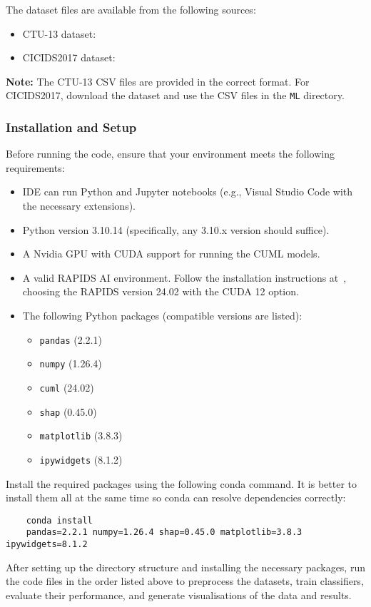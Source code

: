 The dataset files are available from the following sources:

\begin{itemize}
    \item CTU-13 dataset:~\cite{CTU13download}
    \item CICIDS2017 dataset:~\cite{CICIDS2017download}
\end{itemize}

\textbf{Note:} The CTU-13 CSV files are provided in the correct format. For CICIDS2017, download the dataset and use the CSV files in the \texttt{ML} directory.

\subsubsection{Installation and Setup}

Before running the code, ensure that your environment meets the following requirements:

\begin{itemize}
    \item IDE can run Python and Jupyter notebooks (e.g., Visual Studio Code with the necessary extensions).
    \item Python version 3.10.14 (specifically, any 3.10.x version should suffice).
    \item A Nvidia GPU with CUDA support for running the CUML models.
    \item A valid RAPIDS AI environment. 
    Follow the installation instructions at~\cite{RAPIDSdownload}, choosing the RAPIDS version 24.02 with the CUDA 12 option.
    \item The following Python packages (compatible versions are listed):
    \begin{itemize}
        \item \texttt{pandas} (2.2.1)
        \item \texttt{numpy} (1.26.4)
        \item \texttt{cuml} (24.02)
        \item \texttt{shap} (0.45.0)
        \item \texttt{matplotlib} (3.8.3)
        \item \texttt{ipywidgets} (8.1.2)
    \end{itemize}
\end{itemize}

Install the required packages using the following conda command. It is better to install them all at the same time so conda can resolve dependencies correctly:

\begin{verbatim}
    conda install 
    pandas=2.2.1 numpy=1.26.4 shap=0.45.0 matplotlib=3.8.3 ipywidgets=8.1.2
\end{verbatim}

After setting up the directory structure and installing the necessary packages, run the code files in the order listed above to preprocess the datasets, train classifiers, evaluate their performance, and generate visualisations of the data and results.